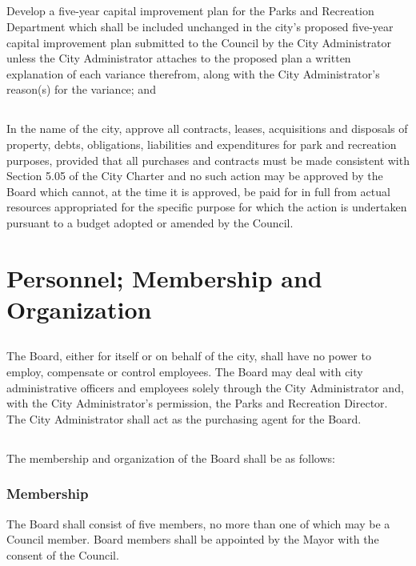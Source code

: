 \subsection{}
Develop a five-year capital improvement plan for the Parks and Recreation Department which shall be included unchanged in the city’s proposed five-year capital improvement plan submitted to the Council by the City Administrator unless the City Administrator attaches to the proposed plan a written explanation of each variance therefrom, along with the City Administrator’s reason(s) for the variance; and
\subsection{}
In the name of the city, approve all contracts, leases, acquisitions and disposals of property, debts, obligations, liabilities and expenditures for park and recreation purposes, provided that all purchases and contracts must be made consistent with Section 5.05 of the City Charter and no such action may be approved by the Board which cannot, at the time it is approved, be paid for in full from actual resources appropriated for the specific purpose for which the action is undertaken pursuant to a budget adopted or amended by the Council.

\section{Personnel; Membership and Organization}
\subsection{}
The Board, either for itself or on behalf of the city, shall have no power to employ, compensate or control employees. The Board may deal with city administrative officers and employees solely through the City Administrator and, with the City Administrator’s permission, the Parks and Recreation Director. The City Administrator shall act as the purchasing agent for the Board.
\subsection{}
The membership and organization of the Board shall be as follows:
\subsubsection{Membership}
The Board shall consist of five members, no more than one of which may be a Council member. Board members shall be appointed by the Mayor with the consent of the Council.

